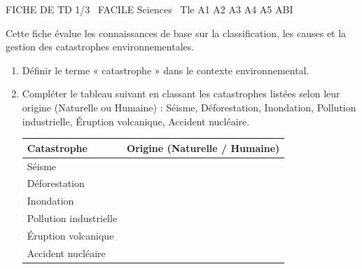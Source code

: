 \documentclass[11pt]{article}
\begin{document}
\begin{tcolorbox}[enhanced,colback=popink,colframe=popink,arc=10pt,boxrule=0pt,left=12pt,right=12pt,top=9pt,bottom=9pt]
{\color{white}\popxbold\small FICHE DE TD 1/3 \textbullet\ FACILE \hfill Sciences \textbullet\ Tle A1 A2 A3 A4 A5 ABI\par}
\end{tcolorbox}
\vspace{4pt}
Cette fiche évalue les connaissances de base sur la classification, les causes et la gestion des catastrophes environnementales.

\begin{exercice}
\begin{enumerate}
    \item Définir le terme « catastrophe » dans le contexte environnemental.
    \item Compléter le tableau suivant en classant les catastrophes listées selon leur origine (Naturelle ou Humaine) : Séisme, Déforestation, Inondation, Pollution industrielle, Éruption volcanique, Accident nucléaire.
    \begin{tabular}{|l|c|}
    \hline
    \textbf{Catastrophe} & \textbf{Origine (Naturelle / Humaine)} \\
    \hline
    Séisme & \\
    \hline
    Déforestation & \\
    \hline
    Inondation & \\
    \hline
    Pollution industrielle & \\
    \hline
    Éruption volcanique & \\
    \hline
    Accident nucléaire & \\
    \hline
    \end{tabular}
\end{enumerate}
\end{exercice}
\end{document}

